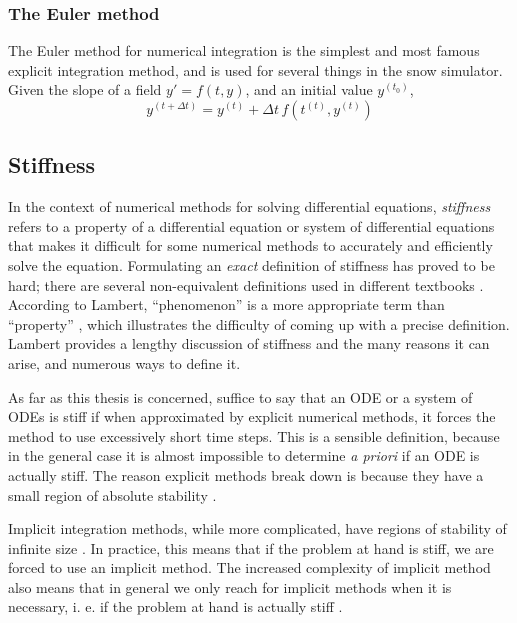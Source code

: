 \subsubsection*{The Euler method}
The Euler method for numerical integration is the simplest and most famous
explicit integration method, and is used for several things in the snow simulator.
Given the slope of a field $y' = f(t, y)$, and an initial value $y^{(t_0)}$,
\begin{equation}
    y^{(t+\Delta t)} = y^{(t)} + \Delta t \, f(t^{(t)}, y^{(t)})
\end{equation}

\subsection{Stiffness}
\label{sec:stiffness}

\noindent
In the context of numerical methods for solving differential equations,
{\em stiffness} refers to a property of a differential equation or 
system of differential equations that makes 
it difficult for some numerical methods to accurately and efficiently solve 
the equation. 
Formulating an {\em exact} definition of stiffness has proved to be hard;
there are several non-equivalent definitions used in different textbooks
\cite{suli_numanal}.
According to Lambert, ``phenomenon'' is a more appropriate term than
``property'' \cite{lambert_ode}, which illustrates the difficulty of
coming up with a precise definition.
Lambert provides a lengthy discussion of stiffness and the many reasons
it can arise, and numerous ways to define it.

As far as this thesis is concerned, suffice to say that an ODE or a system
of ODEs is stiff if when approximated by explicit numerical methods, it forces
the method to use excessively short time steps.
This is a sensible definition, because in the general case it is almost impossible
to determine {\em a priori} if an ODE is actually stiff.
The reason explicit methods break down is because they have a small region of
absolute stability
\cite{suli_numanal}.

Implicit integration methods, while more complicated, have regions of stability 
of infinite size
\cite{fausto_nummat}.
In practice, this means that if the problem at hand is stiff, we are forced to use
an implicit method.
The increased complexity of implicit method also means that in general we only reach
for implicit methods when it is necessary, i. e. if the problem at hand is actually stiff
\cite[p. 353]{fausto_nummat}.


